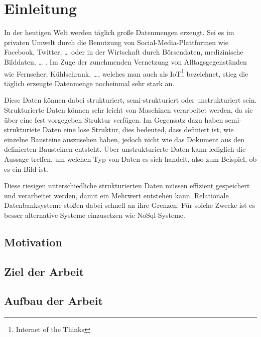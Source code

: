 \chapter{Einleitung}

In der heutigen Welt werden täglich große Datenmengen erzeugt. Sei es im
privaten Umwelt durch die Benutzung von Social-Media-Plattformen wie Facebook,
Twitter, \ldots{} oder in der Wirtschaft durch Börsendaten, medizinische
Bilddaten, \ldots{} . Im Zuge der zunehmenden Vernetzung von
Alltagsgegenständen wie Fernseher, Kühlschrank, \ldots{}, welches man auch als
IoT\footnote{Internet of the Thinks} bezeichnet, stieg die täglich erzeugte
Datenmenge nocheinmal sehr stark an.

Diese Daten können dabei strukturiert, semi-strukturiert oder unstrukturiert
sein. Strukturierte Daten können sehr leicht von Maschinen verarbeitet werden,
da sie über eine fest vorgegeben Struktur verfügen. Im Gegensatz dazu haben
semi-strukturiete Daten eine lose Struktur, dies bedeuted, dass definiert ist,
wie einzelne Bausteine auszusehen haben, jedoch nicht wie das Dokument aus den
definierten Bausteinen entsteht. Über unstrukturierte Daten kann lediglich die
Aussage treffen, um welchen Typ von Daten es sich handelt, also zum Beispiel,
ob es ein Bild ist.

Diese riesigen unterschiedliche strukturierten Daten müssen effizient
gespeichert und verarbeitet werden, damit ein Mehrwert entstehen kann.
Relationale Datenbanksysteme stoßen dabei schnell an ihre Grenzen. Für solche
Zwecke ist es besser alternative Systeme einzusetzen wie NoSql-Systeme.

\section{Motivation}
\section{Ziel der Arbeit}
\section{Aufbau der Arbeit}
